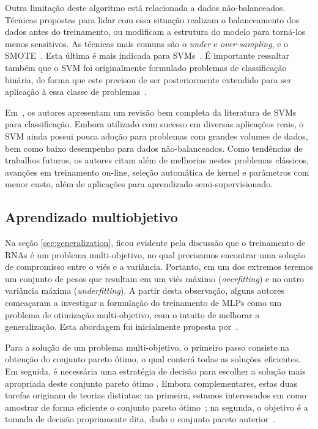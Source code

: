 \documentclass[conference]{IEEEtran}
\begin{document}
 	Outra limitação deste algoritmo está relacionada a dados não-balanceados. Técnicas propostas para lidar com essa situação realizam o balanceamento dos dados antes do treinamento, ou modificam a estrutura do modelo para torná-los menos sensitivos. As técnicas mais comuns são o \textit{under} e \textit{over-sampling}, e o SMOTE~\cite{chawla2002smote}. Esta última é mais indicada para SVMs~\cite{chawla2003smoteboost}. É importante ressaltar também que o SVM foi originalmente formulado problemas de classificação binária, de forma que este precisou de ser posteriormente extendido para ser aplicação à essa classe de problemas~\cite{weston1998multi, liu2005one}.
 	
	
	Em~\cite{cervantes2020comprehensive}, os autores apresentam um revisão bem completa da literatura de SVMs para classificação. Embora utilizado com sucesso em diversas aplicaçõos reais, o SVM ainda possui pouca adoção para problemas com grandes volumes de dados, bem como baixo desempenho para dados não-balanceados. Como tendências de trabalhos futuros, os autores citam além de melhorias nestes problemas clássicos, avanções em treinamento on-line, seleção automática de kernel e parâmetros com menor custo, além de aplicações para aprendizado semi-supervisionado.
	
	\subsection{Aprendizado multiobjetivo}
	
	Na seção \ref{sec:generalization}, ficou evidente pela discussão que o treinamento de RNAs é um problema multi-objetivo, no qual precisamos encontrar uma solução de compromisso entre o viés e a variância. Portanto, em um dos extremos teremos um conjunto de pesos que resultam em um viés máximo (\textit{overfitting}) e no outro variância máxima (\textit{underfitting}). A partir desta observação, 
	alguns autores comeaçaram a investigar a formulação do treinamento de MLPs como um problema de otimização multi-objetivo, com o intuito de melhorar a generalização. Esta abordagem foi inicialmente proposta por~\cite{de2000improving}.
	
	Para a solução de um problema multi-objetivo, o primeiro passo consiste na obtenção do conjunto pareto ótimo, o qual conterá todas as soluções eficientes. Em seguida, é necessária uma estratégia de decisão para escolher a solução mais apropriada deste conjunto pareto ótimo \cite{deb2014multi}. Embora complementares, estas duas tarefas originam de teorias distintas: na primeira, estamos interessados em como amostrar de forma eficiente o conjunto pareto ótimo~\cite{collette2004multiobjective}; na segunda, o objetivo é a tomada de decisão propriamente dita, dado o conjunto pareto anterior~\cite{parreiras2005decision}. 
	
\end{document}
